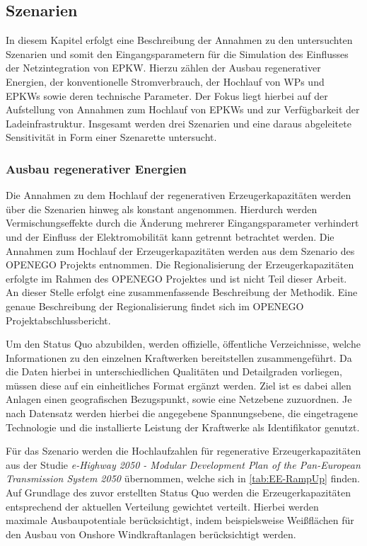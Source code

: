 \subsection{Szenarien}

In diesem Kapitel erfolgt eine Beschreibung der Annahmen zu den untersuchten Szenarien und somit den Eingangsparametern für die Simulation des Einflusses der Netzintegration von \gls{EPKW}.
Hierzu zählen der Ausbau regenerativer Energien, der konventionelle Stromverbrauch, der Hochlauf von \glspl{WP} und \glspl{EPKW} sowie deren technische Parameter.
Der Fokus liegt hierbei auf der Aufstellung von Annahmen zum Hochlauf von \glspl{EPKW} und zur Verfügbarkeit der Ladeinfrastruktur.
Insgesamt werden drei Szenarien und eine daraus abgeleitete Sensitivität in Form einer Szenarette untersucht.


\subsubsection{Ausbau regenerativer Energien}

Die Annahmen zu dem Hochlauf der regenerativen Erzeugerkapazitäten werden über die Szenarien hinweg als konstant angenommen.
Hierdurch werden Vermischungseffekte durch die Änderung mehrerer Eingangsparameter verhindert und der Einfluss der Elektromobilität kann getrennt betrachtet werden.
Die Annahmen zum Hochlauf der Erzeugerkapazitäten werden aus dem Szenario \ego des \gls{OPENEGO} Projekts \cite{Mueller2019} entnommen.
Die Regionalisierung der Erzeugerkapazitäten erfolgte im Rahmen des \gls{OPENEGO} Projektes und ist nicht Teil dieser Arbeit.
An dieser Stelle erfolgt eine zusammenfassende Beschreibung der Methodik.
Eine genaue Beschreibung der Regionalisierung findet sich im \gls{OPENEGO} Projektabschlussbericht.\medskip

Um den Status Quo abzubilden, werden offizielle, öffentliche Verzeichnisse, welche Informationen zu den einzelnen Kraftwerken bereitstellen zusammengeführt.
Da die Daten hierbei in unterschiedlichen Qualitäten und Detailgraden vorliegen, müssen diese auf ein einheitliches Format ergänzt werden.
Ziel ist es dabei allen Anlagen einen geografischen Bezugspunkt, sowie eine Netzebene zuzuordnen.
Je nach Datensatz werden hierbei die angegebene Spannungsebene, die eingetragene Technologie und die installierte Leistung der Kraftwerke als Identifikator genutzt.\medskip

Für das Szenario \ego werden die Hochlaufzahlen für regenerative Erzeugerkapazitäten aus der Studie \textit{e-Highway 2050 - Modular Development Plan of the Pan-European Transmission System 2050} \cite{EEHPG2015} übernommen, welche sich in \autoref{tab:EE-RampUp} finden.
Auf Grundlage des zuvor erstellten Status Quo werden die Erzeugerkapazitäten entsprechend der aktuellen Verteilung gewichtet verteilt.
Hierbei werden maximale Ausbaupotentiale berücksichtigt, indem beispielsweise Weißflächen für den Ausbau von Onshore Windkraftanlagen berücksichtigt werden.

